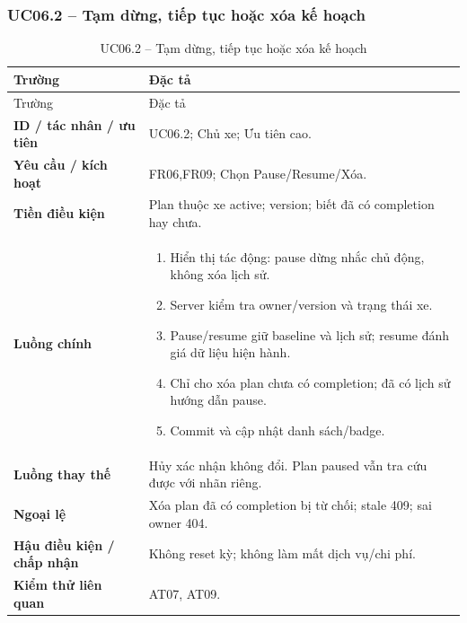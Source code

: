 \subsubsection{UC06.2 -- Tạm dừng, tiếp tục hoặc xóa kế hoạch}\label{uc:UC06.2}
\begin{smalltable}\begin{longtable}{L{3.2cm}L{11.8cm}}
\caption{UC06.2 -- Tạm dừng, tiếp tục hoặc xóa kế hoạch}\label{tab:UC06.2}\\
\toprule Trường & Đặc tả\\\midrule\endfirsthead
\toprule Trường & Đặc tả\\\midrule\endhead
\textbf{ID / tác nhân / ưu tiên} & UC06.2; Chủ xe; Ưu tiên cao.\\
\textbf{Yêu cầu / kích hoạt} & FR06,FR09; Chọn Pause/Resume/Xóa.\\
\textbf{Tiền điều kiện} & Plan thuộc xe active; version; biết đã có completion hay chưa.\\
\textbf{Luồng chính} & \begin{enumerate}[leftmargin=*,nosep]
\item Hiển thị tác động: pause dừng nhắc chủ động, không xóa lịch sử.
\item Server kiểm tra owner/version và trạng thái xe.
\item Pause/resume giữ baseline và lịch sử; resume đánh giá dữ liệu hiện hành.
\item Chỉ cho xóa plan chưa có completion; đã có lịch sử hướng dẫn pause.
\item Commit và cập nhật danh sách/badge.
\end{enumerate}\\
\textbf{Luồng thay thế} & Hủy xác nhận không đổi. Plan paused vẫn tra cứu được với nhãn riêng.\\
\textbf{Ngoại lệ} & Xóa plan đã có completion bị từ chối; stale 409; sai owner 404.\\
\textbf{Hậu điều kiện / chấp nhận} & Không reset kỳ; không làm mất dịch vụ/chi phí.\\
\textbf{Kiểm thử liên quan} & AT07, AT09.\\
\bottomrule\end{longtable}\end{smalltable}
